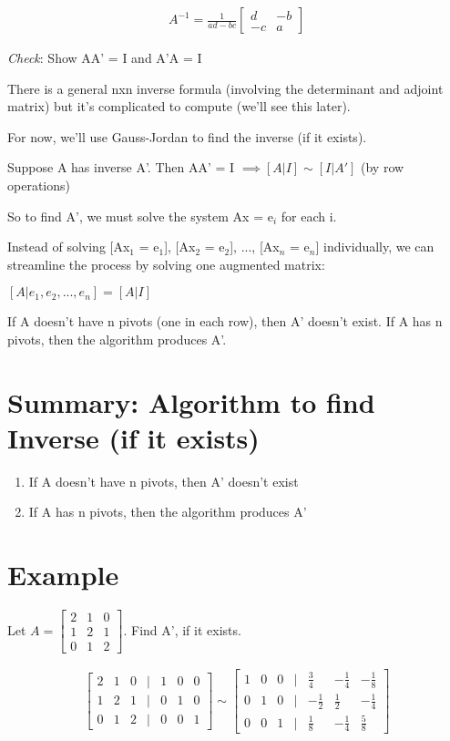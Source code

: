 \documentclass[12pt,a4paper]{article}
\begin{document}
\begin{align*}
A^{-1} = \frac{1}{ad-bc} \begin{bmatrix} d & -b \\ -c & a \end{bmatrix}
\end{align*}

\textit{Check}: Show AA' = I and A'A = I

There is a general nxn inverse formula (involving the determinant and adjoint matrix) but it's complicated to compute (we'll see this later).

For now, we'll use Gauss-Jordan to find the inverse (if it exists).

Suppose A has inverse A'.
Then AA' = I
$\implies [A|I] \sim [I|A']$ (by row operations)

So to find A', we must solve the system Ax = e$_i$ for each i.

Instead of solving [Ax$_1$ = e$_1$], [Ax$_2$ = e$_2$], ..., [Ax$_n$ = e$_n$] individually, we can streamline the process by solving one augmented matrix:

$[A|e_1, e_2, ..., e_n] = [A|I]$

If A doesn't have n pivots (one in each row), then A' doesn't exist.
If A has n pivots, then the algorithm produces A'.

\section{Summary: Algorithm to find Inverse (if it exists)}

\begin{enumerate}
    \item If A doesn't have n pivots, then A' doesn't exist
    \item If A has n pivots, then the algorithm produces A'
\end{enumerate}

\section{Example}

Let $A = \begin{bmatrix} 2 & 1 & 0 \\ 1 & 2 & 1 \\ 0 & 1 & 2 \end{bmatrix}$. Find A', if it exists.

\begin{align*}
\begin{bmatrix}
2 & 1 & 0 & | & 1 & 0 & 0 \\
1 & 2 & 1 & | & 0 & 1 & 0 \\
0 & 1 & 2 & | & 0 & 0 & 1
\end{bmatrix} \sim
\begin{bmatrix}
1 & 0 & 0 & | & \frac{3}{4} & -\frac{1}{4} & -\frac{1}{8} \\
0 & 1 & 0 & | & -\frac{1}{2} & \frac{1}{2} & -\frac{1}{4} \\
0 & 0 & 1 & | & \frac{1}{8} & -\frac{1}{4} & \frac{5}{8}
\end{bmatrix}
\end{align*}
\end{document}
